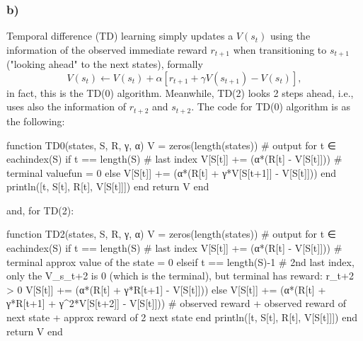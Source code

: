 \documentclass[12pt]{article}
\begin{document}
\subsubsection*{b)}
Temporal difference (TD) learning simply updates a $V(s_t)$ using the information of the observed immediate reward $r_{t+1}$ when transitioning to $s_{t+1}$ ("looking ahead" to the next states), formally
\begin{equation}
    V(s_t) \leftarrow V(s_t) + \alpha[r_{t+1} + \gamma V(s_{t+1}) - V(s_t)],
\end{equation}
in fact, this is the TD(0) algorithm. Meanwhile, TD(2) looks 2 steps ahead, i.e., uses also the information of $r_{t+2}$ and $s_{t+2}$.
The code for TD(0) algorithm is as the following:
\begin{jllisting}
    function TD0(states, S, R, γ, α)
        V = zeros(length(states)) # output
        for t ∈ eachindex(S)
            if t == length(S) # last index
                V[S[t]] += (α*(R[t] - V[S[t]]))  # terminal valuefun = 0
            else
                V[S[t]] += (α*(R[t] + γ*V[S[t+1]] - V[S[t]]))
            end
            println([t, S[t], R[t], V[S[t]]])
        end
        return V
    end
\end{jllisting}
and, for TD(2):
\begin{jllisting}
    function TD2(states, S, R, γ, α)
        V = zeros(length(states)) # output
        for t ∈ eachindex(S)
            if t == length(S) # last index
                V[S[t]] += (α*(R[t] - V[S[t]]))  # terminal approx value of the state = 0
            elseif t == length(S)-1 # 2nd last index, only the V_s_t+2 is 0 (which is the terminal), but terminal has reward: r_t+2 > 0
                V[S[t]] += (α*(R[t] + γ*R[t+1] - V[S[t]]))
            else
                V[S[t]] += (α*(R[t] + γ*R[t+1] + γ^2*V[S[t+2]] - V[S[t]])) # observed reward + observed reward of next state + approx reward of 2 next state 
            end
            println([t, S[t], R[t], V[S[t]]])
        end
        return V
    end
\end{jllisting}
\end{document}
